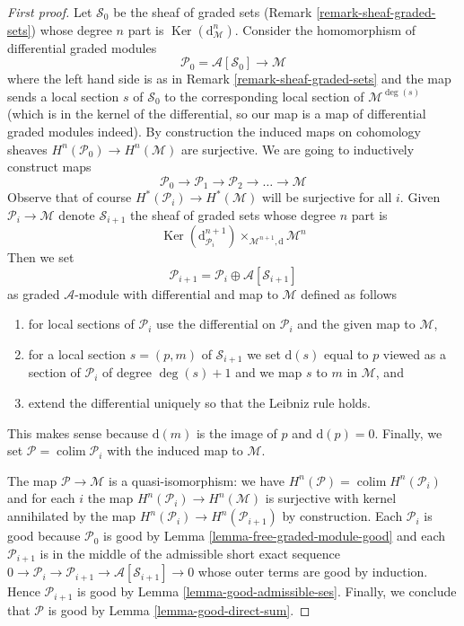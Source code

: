\documentclass{stacks-project}
\theoremstyle{plain}
\theoremstyle{definition}
\theoremstyle{remark}
\numberwithin{equation}{subsection}
\def\colim{\mathop{\mathrm{colim}}\nolimits}
\def\Ker{\mathop{\mathrm{Ker}}}
\begin{document}
\begin{proof}[First proof]
Let $\mathcal{S}_0$ be the sheaf of graded sets
(Remark \ref{remark-sheaf-graded-sets})
whose degree $n$ part is $\Ker(\text{d}_\mathcal{M}^n)$.
Consider the homomorphism of differential graded modules
$$
\mathcal{P}_0 = \mathcal{A}[\mathcal{S}_0] \longrightarrow \mathcal{M}
$$
where the left hand side is as in Remark \ref{remark-sheaf-graded-sets}
and the map sends a local section $s$ of $\mathcal{S}_0$
to the corresponding local section of $\mathcal{M}^{\deg(s)}$
(which is in the kernel of the differential, so our map is
a map of differential graded modules indeed). By construction the
induced maps on cohomology sheaves $H^n(\mathcal{P}_0) \to H^n(\mathcal{M})$
are surjective. We are going to inductively construct maps
$$
\mathcal{P}_0 \to \mathcal{P}_1 \to \mathcal{P}_2 \to \ldots \to \mathcal{M}
$$
Observe that of course $H^*(\mathcal{P}_i) \to H^*(\mathcal{M})$
will be surjective for all $i$.
Given $\mathcal{P}_i \to \mathcal{M}$ denote $\mathcal{S}_{i + 1}$
the sheaf of graded sets whose degree $n$ part is
$$
\Ker(\text{d}_{\mathcal{P}_i}^{n + 1})
\times_{\mathcal{M}^{n + 1}, \text{d}}
\mathcal{M}^n
$$
Then we set
$$
\mathcal{P}_{i + 1} = \mathcal{P}_i \oplus \mathcal{A}[\mathcal{S}_{i + 1}]
$$
as graded $\mathcal{A}$-module with differential and map to
$\mathcal{M}$ defined as follows
\begin{enumerate}
\item for local sections of $\mathcal{P}_i$ use the differential on
$\mathcal{P}_i$ and the given map to $\mathcal{M}$,
\item for a local section $s = (p, m)$ of $\mathcal{S}_{i + 1}$ we set
$\text{d}(s)$ equal to $p$ viewed as a section of $\mathcal{P}_i$
of degree $\deg(s) + 1$ and we map $s$ to $m$ in $\mathcal{M}$, and
\item extend the differential uniquely so that the Leibniz rule holds.
\end{enumerate}
This makes sense because $\text{d}(m)$ is the image of $p$ and
$\text{d}(p) = 0$.
Finally, we set $\mathcal{P} = \colim \mathcal{P}_i$ with the
induced map to $\mathcal{M}$.

\medskip\noindent
The map $\mathcal{P} \to \mathcal{M}$ is a quasi-isomorphism:
we have $H^n(\mathcal{P}) = \colim H^n(\mathcal{P}_i)$
and for each $i$ the map $H^n(\mathcal{P}_i) \to H^n(\mathcal{M})$
is surjective with kernel annihilated  by the map
$H^n(\mathcal{P}_i) \to H^n(\mathcal{P}_{i + 1})$ by construction.
Each $\mathcal{P}_i$ is good because $\mathcal{P}_0$ is good
by Lemma \ref{lemma-free-graded-module-good} and each $\mathcal{P}_{i + 1}$
is in the middle of the admissible short exact sequence
$0 \to \mathcal{P}_i \to \mathcal{P}_{i + 1} \to
\mathcal{A}[\mathcal{S}_{i + 1}] \to 0$
whose outer terms are good by induction. Hence
$\mathcal{P}_{i + 1}$ is good by
Lemma \ref{lemma-good-admissible-ses}.
Finally, we conclude that $\mathcal{P}$ is good by
Lemma \ref{lemma-good-direct-sum}.
\end{proof}
\end{document}
